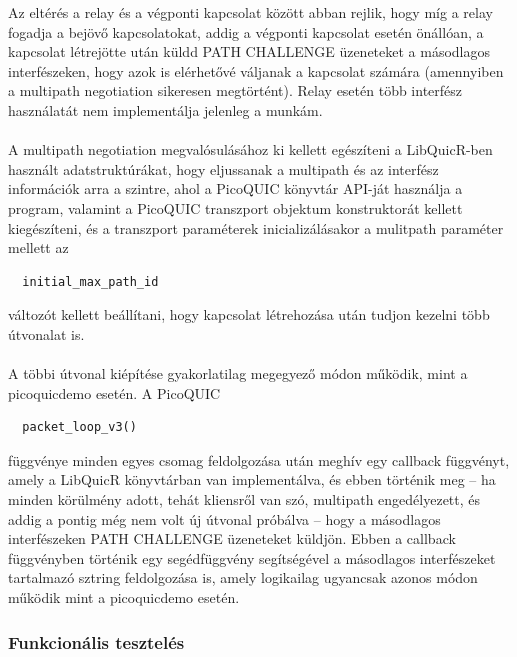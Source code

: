 \documentclass[a4paper,oneside]{article}
\begin{document}
Az eltérés a relay és a végponti kapcsolat között abban rejlik, hogy míg a relay fogadja a bejövő kapcsolatokat, addig a végponti kapcsolat esetén önállóan,
a kapcsolat létrejötte után küldd PATH CHALLENGE üzeneteket a másodlagos interfészeken, 
hogy azok is elérhetővé váljanak a kapcsolat számára (amennyiben a multipath negotiation sikeresen megtörtént).
Relay esetén több interfész használatát nem implementálja jelenleg a munkám.

\paragraph{}

A multipath negotiation megvalósulásához ki kellett egészíteni a LibQuicR-ben
használt adatstruktúrákat, hogy eljussanak a multipath és az interfész információk
arra a szintre, ahol a PicoQUIC könyvtár API-ját használja a program, valamint 
a PicoQUIC transzport objektum konstruktorát 
kellett kiegészíteni, és a transzport paraméterek inicializálásakor a mulitpath paraméter mellett az 
\begin{verbatim}
  initial_max_path_id
\end{verbatim}
változót kellett beállítani, hogy kapcsolat létrehozása után tudjon kezelni több útvonalat is.

\paragraph{}

A többi útvonal kiépítése gyakorlatilag megegyező módon működik, mint a picoquicdemo esetén. A PicoQUIC 
\begin{verbatim}
  packet_loop_v3()
\end{verbatim}
függvénye minden egyes csomag feldolgozása után meghív egy callback függvényt, amely a LibQuicR könyvtárban van 
implementálva, és ebben történik meg – ha minden körülmény adott, tehát kliensről van szó, 
multipath engedélyezett, és addig a pontig még nem volt új útvonal próbálva – hogy a másodlagos interfészeken PATH CHALLENGE üzeneteket küldjön.
Ebben a callback függvényben történik egy segédfüggvény segítségével a másodlagos interfészeket tartalmazó sztring feldolgozása is, amely logikailag
ugyancsak azonos módon működik mint a picoquicdemo esetén.


\subsubsection{Funkcionális tesztelés}
\paragraph{}
\end{document}
